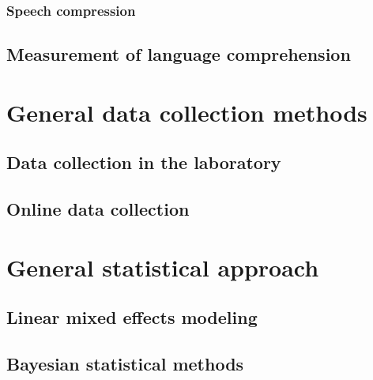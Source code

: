 \documentclass[a4paper, nobind]{templates/ociamthesis}
\begin{document}
\hypertarget{speech-compression}{%
\subsection{Speech compression}\label{speech-compression}}

\hypertarget{measurement-of-language-comprehension}{%
\section{Measurement of language comprehension}\label{measurement-of-language-comprehension}}

\hypertarget{general-data-collection-methods}{%
\chapter{General data collection methods}\label{general-data-collection-methods}}

\minitoc 

\hypertarget{data-collection-in-the-laboratory}{%
\section{Data collection in the laboratory}\label{data-collection-in-the-laboratory}}

\hypertarget{online-data-collection}{%
\section{Online data collection}\label{online-data-collection}}

\hypertarget{general-statistical-approach}{%
\chapter{General statistical approach}\label{general-statistical-approach}}

\hypertarget{linear-mixed-effects-modeling}{%
\section{Linear mixed effects modeling}\label{linear-mixed-effects-modeling}}

\hypertarget{bayesian-statistical-methods}{%
\section{Bayesian statistical methods}\label{bayesian-statistical-methods}}
\end{document}
